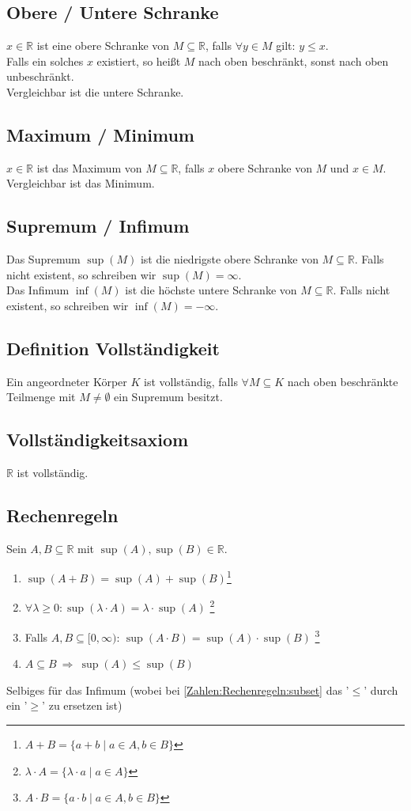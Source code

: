 \documentclass[halfparscip]{scrartcl}
\newcounter{subsection2}
\begin{document}
\subsection{Obere / Untere Schranke}
$x \in \mathbb{R}$ ist eine obere Schranke von $M \subseteq \mathbb{R}$, falls $\forall y \in M$ gilt: $y \leq x$.\\
Falls ein solches $x$ existiert, so heißt $M$ nach oben beschränkt, sonst nach oben unbeschränkt.\\
Vergleichbar ist die untere Schranke.

\subsection{Maximum / Minimum}
$x \in \mathbb{R}$ ist das Maximum von $M \subseteq \mathbb{R}$, falls $x$ obere Schranke von $M$ und $x \in M$.\\
Vergleichbar ist das Minimum.

\subsection{Supremum / Infimum}
Das Supremum $\sup(M)$ ist die niedrigste obere Schranke von $M \subseteq \mathbb{R}$. Falls nicht existent, so schreiben wir $\sup(M) = \infty$.\\
Das Infimum $\inf(M)$ ist die höchste untere Schranke von $M \subseteq \mathbb{R}$. Falls nicht existent, so schreiben wir $\inf(M) = -\infty$.

\subsection{Definition Vollständigkeit}
Ein angeordneter Körper $K$ ist vollständig, falls $\forall M \subseteq K$ nach oben beschränkte Teilmenge mit $M \neq \emptyset$ ein Supremum besitzt.

\subsection{Vollständigkeitsaxiom}
$\mathbb{R}$ ist vollständig.

\subsection{Rechenregeln}
Sein $A, B \subseteq \mathbb{R}$ mit $\sup(A), \sup(B) \in \mathbb{R}$.
\begin{enumerate}
	\item $\sup(A + B) = \sup(A) + \sup (B)$\footnote{$A + B = \{a + b \mid a \in A, b \in B\}$}
	\item $\forall \lambda \geq 0: \sup(\lambda \cdot A) = \lambda \cdot \sup(A)$ \footnote{$\lambda \cdot A = \{\lambda \cdot a \mid a \in A\}$}
	\item Falls $A, B \subseteq [0,\infty)$: $\sup(A \cdot B) = \sup(A) \cdot \sup(B)$ \footnote{$A \cdot B = \{a \cdot b \mid a \in A, b \in B\}$}
	\item\label{Zahlen:Rechenregeln:subset} $A \subseteq B \ \Rightarrow \  \sup(A) \leq \sup(B)$
\end{enumerate}
Selbiges für das Infimum (wobei bei \autoref{Zahlen:Rechenregeln:subset} das '$\leq$' durch ein '$\geq$' zu ersetzen ist)
\end{document}
